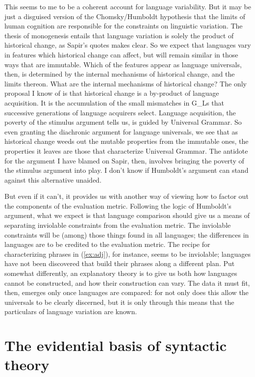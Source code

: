 This seems to me to be a coherent account for language variability. But it may be just a disguised version of the Chomsky/Humboldt hypothesis that the limits of human cognition are responsible for the constraints on linguistic variation. The thesis of monogenesis entails that language variation is solely the product of historical change, as Sapir's quotes makes clear. So we expect that languages vary in features which historical change can affect, but will remain similar in those ways that are immutable. Which of the features appear as language universals, then, is determined by the internal mechanisms of historical change, and the limits thereon. What are the internal mechanisms of historical change? The only proposal I know of is that historical change is a by-product of language acquisition. It is the accumulation of the small mismatches in G_Ls that successive generations of language acquirers select. Language acquisition, the poverty of the stimulus argument tells us, is guided by Universal Grammar. So even granting the diachronic argument for language universals, we see that as historical change weeds out the mutable properties from the immutable ones, the properties it leaves are those that characterize Universal Grammar. The antidote for the argument I have blamed on Sapir, then, involves bringing the poverty of the stimulus argument into play. I don't know if Humboldt's argument can stand against this alternative unaided.

But even if it can't, it provides us with another way of viewing how to factor out the components of the evaluation metric. Following the logic of Humboldt's argument, what we expect is that language comparison should give us a means of separating inviolable constraints from the evaluation metric. The inviolable constraints will be (among) those things found in all languages; the differences in languages are to be credited to the evaluation metric. The recipe for characterizing phrases in (\ref{ex:adj}), for instance, seems to be inviolable; languages have not been discovered that build their phrases along a different plan. Put somewhat differently, an explanatory theory is to give us both how languages cannot be constructed, and how their construction can vary. The data it must fit, then, emerges only once languages are compared: for not only does this allow the universals to be clearly discerned, but it is only through this means that the particulars of language variation are known.

\section{The evidential basis of syntactic theory}

